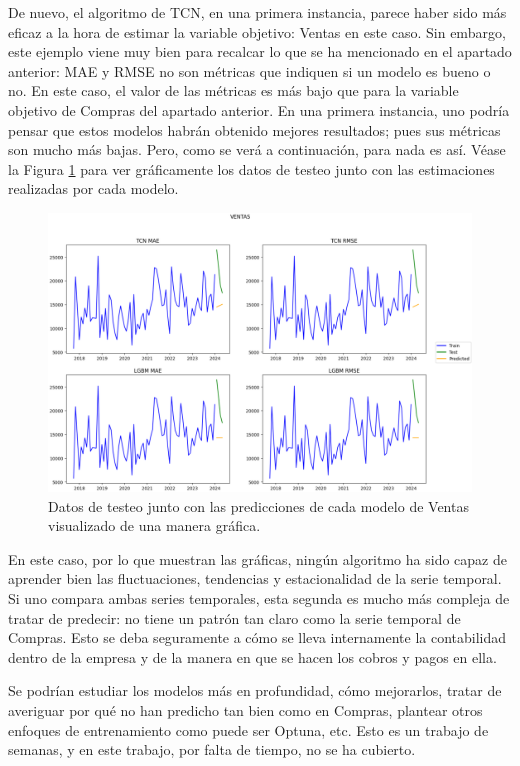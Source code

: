 De nuevo, el algoritmo de TCN, en una primera instancia, parece haber sido más eficaz a la hora de estimar la variable objetivo: Ventas en este caso. Sin embargo, este ejemplo viene muy bien para recalcar lo que se  ha mencionado en el apartado anterior: MAE y RMSE no son métricas que indiquen si un modelo es bueno o no. En este caso, el  valor de las métricas es más bajo que para la variable objetivo de Compras del apartado anterior. En una primera instancia, uno podría pensar que estos modelos habrán obtenido mejores resultados; pues sus métricas son mucho más bajas. Pero, como se verá a continuación, para nada es así. Véase la Figura \ref{comparativaVentas} para ver gráficamente los datos de testeo junto con las estimaciones realizadas por cada modelo.

\begin{figure}[H]
	\centering
	\includegraphics[scale = 0.5]{imgs/comparativaVentas}
	\caption{Datos de testeo junto con las predicciones de cada modelo de Ventas visualizado de una manera gráfica.}
	\label{comparativaVentas}
\end{figure}

En este caso, por lo que muestran las gráficas, ningún algoritmo ha sido capaz de aprender bien las fluctuaciones, tendencias y estacionalidad de la serie temporal. Si uno compara ambas series temporales, esta segunda es mucho más compleja de tratar de predecir: no tiene un patrón tan claro como la serie temporal de Compras. Esto se deba seguramente a cómo se lleva internamente la contabilidad dentro de la empresa y de la manera en que se hacen los cobros y pagos en ella.

Se podrían estudiar los modelos más en profundidad, cómo mejorarlos, tratar de averiguar por qué no han predicho tan bien como en Compras, plantear otros enfoques de entrenamiento como puede ser Optuna, etc. Esto es un trabajo de semanas, y en este trabajo, por falta de tiempo, no se ha cubierto. 

